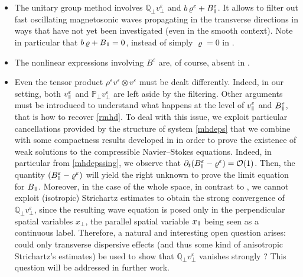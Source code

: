 \documentclass[11pt,reqno]{amsart}
\def \Q{{\mathbb{Q}}}
\def \P{{\mathbb{P}}}
\newcommand{\myparallel}{{\mkern3mu\vphantom{\perp}\vrule depth 0pt\mkern2mu\vrule depth 0pt\mkern3mu}}
\begin{document}
\begin{itemize}
\item The unitary group  method involves $ \Q_\perp v^\varepsilon_\perp $ and $ b \, \varrho^\varepsilon + B^\varepsilon_\myparallel $. It allows to filter out fast oscillating magnetosonic waves propagating in the transverse directions in ways that have not yet been investigated (even in the smooth context). Note in particular that $ b \, \varrho + B_\myparallel = 0 $, instead of simply $ \varrho = 0 $ in \cite{LM98}.
 \item The nonlinear expressions involving $ B^\varepsilon $ are, of course, absent in \cite{LM98}.
 \item Even the tensor product $ \rho^\varepsilon v^\varepsilon \otimes v^\varepsilon $ must be dealt differently. Indeed, in our setting, both $ v^\varepsilon_\myparallel $ and $ \P_\perp v^\varepsilon_\perp $ are left aside by the filtering. Other arguments must be introduced to understand what happens at the level of $ v^\varepsilon_\myparallel $ and $B^\varepsilon_\myparallel $, that is how to recover \eqref{rmhd}. To deal with this issue, we exploit  particular cancellations provided by the structure of system \eqref{mhdeps} that we combine with some compactness results developed in \cite{Lio98} in order to prove the existence of weak solutions to the compressible Navier--Stokes equations. Indeed, in particular from \eqref{mhdepssing}, we observe that $\partial_t(B^\varepsilon_\myparallel- \varrho^\varepsilon ) = \mathcal{O}(1)$. Then, the quantity $(B^\varepsilon_\myparallel- \varrho^\varepsilon )$ will yield the right unknown to prove the limit equation for $ B_\myparallel$. Moreover, in the case of the whole space, in contrast to  \cite{DG99}, we cannot exploit  (isotropic) Strichartz estimates to obtain the strong convergence of $ \Q_\perp v^\varepsilon_\perp $, since the resulting wave equation is posed only in the perpendicular spatial variables $x_\perp$, the parallel spatial variable $x_\myparallel$ being seen as a continuous label. Therefore, a natural and interesting open question arises: could only transverse dispersive effects (and thus some kind of anisotropic Strichartz's estimates) be used to show that $ \Q_\perp v^\varepsilon_\perp $ vanishes strongly ? This question will be addressed in further work.
\end{itemize}


\end{document}
